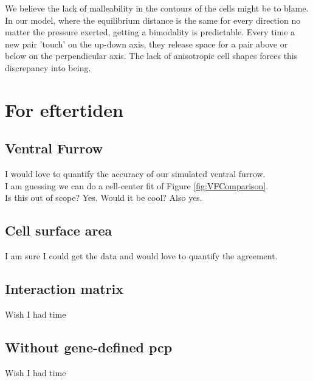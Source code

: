 We believe the lack of malleability in the contours of the cells might be to blame.\\
In our model, where the equilibrium distance is the same for every direction no matter the pressure exerted, getting a bimodality is predictable.
Every time a new pair 'touch' on the up-down axis, they release space for a pair above or below on the perpendicular axis. The lack of anisotropic cell shapes forces this discrepancy into being.






\section{For eftertiden}
\subsection{Ventral Furrow}
I would love to quantify the accuracy of our simulated ventral furrow.\\
I am guessing we can do a cell-center fit of Figure \ref{fig:VFComparison}.\\
Is this out of scope? Yes. Would it be cool? Also yes.

\subsection{Cell surface area}
I am sure I could get the data and would love to quantify the agreement.

\subsection{Interaction matrix}
Wish I had time

\subsection{Without gene-defined pcp}
Wish I had time

